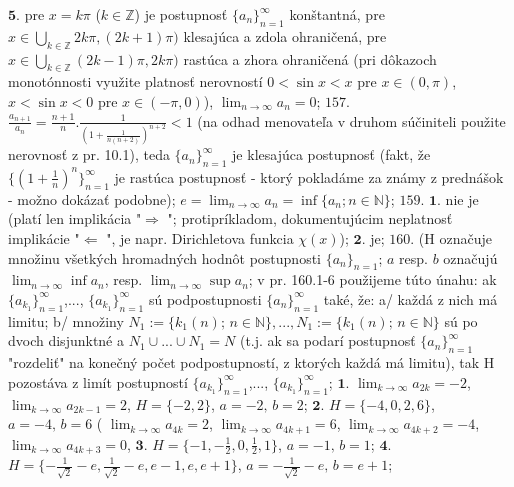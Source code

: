 $\boldsymbol{5.}$ pre $x=k \pi $  ($k \in \mathbb{Z}$) je postupnosť  $\lbrace a_{n}\rbrace_{n=1}^{\infty}$ konštantná, pre  $ x \in \bigcup\limits_{k \in \mathbb{Z}}2k \pi, (2k+1)\pi) $ klesajúca a zdola ohraničená, pre  $ x \in \bigcup\limits_{k \in \mathbb{Z}}(2k-1) \pi, 2k\pi) $ rastúca  a zhora ohraničená (pri dôkazoch monotónnosti využite platnosť nerovností  $0 < \sin x < x  $ pre  $x \in (0,\pi)  $, $x < \sin x < 0  $ pre  $x \in (-\pi,0)  $), $\lim_{n\rightarrow \infty}a_{n}=0$;
$\boxed{157.}$  $\frac{a_{n+1}}{a_{n}}= \frac{n+1}{n}. \frac{1}{(1+\frac{1}{n(n+2)})^{n+2}}<1$ (na odhad menovateľa v druhom súčiniteli použite nerovnosť z pr. 10.1), teda $\lbrace a_{n}\rbrace_{n=1}^{\infty }$ je klesajúca postupnosť (fakt, že $\lbrace (1+\frac{1}{n})^{n}\rbrace_{n=1}^{\infty }$ je rastúca postupnosť - ktorý pokladáme za známy z prednášok - možno dokázať podobne); $e=\lim_{n\rightarrow \infty} a_{n} = \inf \lbrace a_{n}; n\in \mathbb{N}\rbrace$;
$\boxed{159.}$ $\boldsymbol{1.}$ nie je (platí len implikácia "$\Rightarrow $ "; protipríkladom, dokumentujúcim neplatnosť implikácie "$\Leftarrow $ ", je napr. Dirichletova funkcia $\chi (x) $);
$\boldsymbol{2.}$ je;
$\boxed{160.}$ (H označuje množinu všetkých hromadných hodnôt postupnosti $\lbrace a_{n}\rbrace_{n=1}$; $a$ resp. $b$ označujú $\lim_{n\rightarrow \infty} \inf a_{n}$, resp. $\lim_{n\rightarrow \infty} \sup a_{n}$; v pr. 160.1-6 použijeme túto únahu: ak $\lbrace a_{k_{1}}\rbrace_{n=1}^{\infty}$,..., $\lbrace a_{k_{1}}\rbrace_{n=1}^{\infty}$ sú podpostupnosti $\lbrace a_{n}\rbrace_{n=1}^{\infty}$ také, že: a/ každá z nich má limitu; b/ množiny  $N_{1}:=\lbrace k_{1} (n); \, n \in \mathbb{N} \rbrace ,...,N_{1}:=\lbrace k_{1} (n); \, n \in \mathbb{N} \rbrace  $ sú po dvoch disjunktné a $N_{1}\cup ... \cup N_{1} = N $ (t.j. ak sa podarí postupnosť $\lbrace a_{n}\rbrace_{n=1}^{\infty}$ "rozdeliť" na konečný počet podpostupností, z ktorých každá má limitu), tak H pozostáva z limít postupností $\lbrace a_{k_{1}}\rbrace_{n=1}^{\infty}$,..., $\lbrace a_{k_{1}}\rbrace_{n=1}^{\infty}$;
$\boldsymbol{1.}$  $\lim_{k\rightarrow \infty} a_{2k}=-2$, $\lim_{k\rightarrow \infty}a_{2k-1}=2$, $ H= \lbrace -2,2\rbrace $, $a=-2, \, b=2 $;
$\boldsymbol{2.}$   $ H= \lbrace -4,0,2,6\rbrace $, $a=-4, \, b=6 $ ( $\lim_{k\rightarrow \infty} a_{4k} = 2$, $\lim_{k\rightarrow \infty} a_{4k+1} = 6$, $\lim_{k\rightarrow \infty} a_{4k+2} = -4$, $\lim_{k\rightarrow \infty} a_{4k+3} = 0$,  
$\boldsymbol{3.}$   $ H= \lbrace -1,-\frac{1}{2},0,\frac{1}{2},1\rbrace $, $a=-1, \, b=1 $;
$\boldsymbol{4.}$   $ H= \lbrace -\frac{1}{\sqrt{2}}-e,\frac{1}{\sqrt{2}}-e,e-1,e,e+1\rbrace $, $a=-\frac{1}{\sqrt{2}}-e, \, b=e+1 $;
